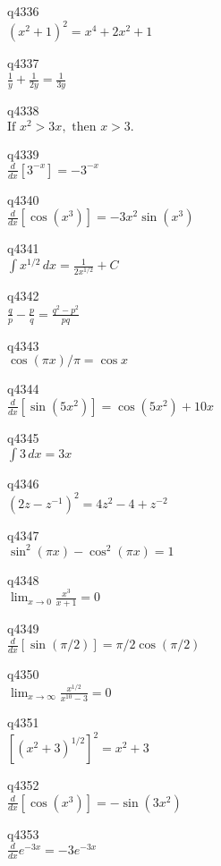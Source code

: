 q4336\\
\(\displaystyle (x^2+1)^2 = x^4 + 2x^2 + 1 \)

q4337\\
\(\displaystyle \frac{1}{y} + \frac{1}{2y} = \frac{1}{3y} \)

q4338\\
\(\displaystyle \text{If } x^2 > 3x, \text{ then } x > 3. \)

q4339\\
\(\displaystyle \frac{d}{dx} [3^{-x}] = -3^{-x} \)

q4340\\
\(\displaystyle \frac{d}{dx} [\cos(x^3)] = -3x^2\sin(x^3) \)

q4341\\
\(\displaystyle \int x^{1/2}\,dx = \frac{1}{2x^{1/2}} + C \)

q4342\\
\(\displaystyle \frac{q}{p} - \frac{p}{q} = \frac{q^2 - p^2}{pq} \)

q4343\\
\(\displaystyle \cos(\pi x) / \pi = \cos x \)

q4344\\
\(\displaystyle \frac{d}{dx} [\sin(5x^2)] = \cos(5x^2) + 10x \)

q4345\\
\(\displaystyle \int 3\,dx = 3x \)

q4346\\
\(\displaystyle (2z - z^{-1})^2 = 4z^2 - 4 + z^{-2} \)

q4347\\
\(\displaystyle \sin^2(\pi x) - \cos^2(\pi x) = 1 \)

q4348\\
\(\displaystyle \lim_{x \rightarrow 0} \frac{x^3}{x+1} = 0 \)

q4349\\
\(\displaystyle \frac{d}{dx} [ \sin(\pi/2) ] = \pi/2 \cos(\pi/2) \)

q4350\\
\(\displaystyle \lim_{x \rightarrow \infty} \frac{x^{1/2}}{x^{10}-3} = 0 \)

q4351\\
\(\displaystyle [(x^2+3)^{1/2}]^2 = x^2 + 3 \)

q4352\\
\(\displaystyle \frac{d}{dx}[\cos(x^3)] = -\sin(3x^2) \)

q4353\\
\(\displaystyle \frac{d}{dx} e^{-3x} = -3e^{-3x} \)

